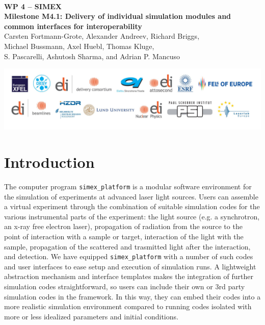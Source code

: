 \documentclass[12pt]{scrartcl}
\begin{document}
\makeatletter
\begin{titlepage}
\thispagestyle{scrheadings}
\begin{center}
$~$\\
\vspace{2cm}
\Huge{\textbf{WP 4 -- SIMEX\\[1cm]
Milestone M4.1: Delivery of individual simulation modules and common interfaces
for interoperability}}\\[5mm]
\vspace{2cm}
\large{
Carsten Fortmann-Grote, Alexander Andreev, Richard Briggs,\\ Michael Bussmann,
  Axel Huebl, Thomas Kluge,\\
 S. Pascarelli, Ashutosh Sharma, and Adrian P. Mancuso\\
 }
\vspace{1cm}
\@date
\end{center}
\vfill%
\includegraphics[width=\textwidth]{PartnerLogos.pdf}
\normalfont
\end{titlepage}
\makeatother
%
\tableofcontents
%
\newpage
%
\section{Introduction}
The computer program \texttt{simex\_platform} \cite{simex_github} is a modular
software environment for the simulation of experiments at advanced laser light
sources. Users can assemble a virtual experiment through the combination
of suitable simulation codes for the various instrumental parts of the
experiment: the light source (e.g. a synchrotron, an x-ray free
electron laser), propagation of radiation from the source to the
point of interaction with a sample or target, interaction of the light with the sample,
propagation of the scattered and trasmitted light after the
interaction, and detection. We have equipped \texttt{simex\_platform}
with a number of such codes and user interfaces to ease setup and execution of
simulation runs. A lightweight abstraction mechanism and interface templates
makes the integration of further simulation codes straightforward, so users can
include their own or 3rd party simulation codes in the framework.
In this way, they can embed their codes
into a more realistic simulation environment compared to running codes isolated
with more or less idealized parameters and initial conditions.
\end{document}
